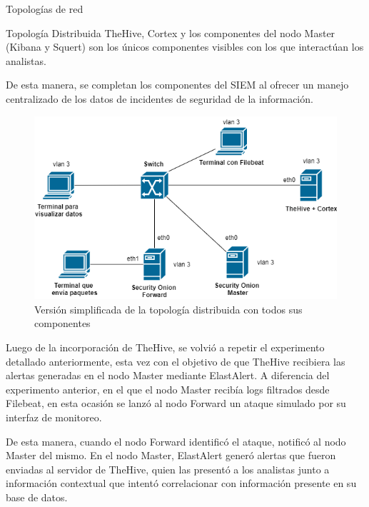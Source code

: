 \begin{section}{Topologías de red }
\begin{subsection} {Topología Distribuida}
            TheHive, Cortex y los componentes del nodo Master (Kibana y Squert) son los únicos componentes visibles con los que interactúan los analistas. \par
            De esta manera, se completan los componentes del SIEM al ofrecer un manejo centralizado de los datos de incidentes de seguridad de la información.\par
            \begin{figure}[h]
            \centering
             \includegraphics[width=1\textwidth]{./iteracion_1_imagenes/figura_33_c_topologia_de_prueba_3.png}
                \caption{Versión simplificada de la topología distribuida con todos sus componentes}
                \label{fig:topologia_distribuida_2}
            \end{figure}
            \FloatBarrier
            Luego de la incorporación de TheHive, se volvió a repetir el experimento detallado anteriormente, esta vez con el objetivo de que TheHive recibiera las alertas generadas en el nodo Master mediante ElastAlert. A diferencia del experimento anterior, en el que el nodo Master recibía logs filtrados desde Filebeat, en esta ocasión se lanzó al nodo Forward un ataque simulado por su interfaz de monitoreo.\par
            De esta manera, cuando el nodo Forward identificó el ataque, notificó al nodo Master del mismo. En el nodo Master, ElastAlert generó alertas que fueron enviadas al servidor de TheHive, quien las presentó a los analistas junto a información contextual que intentó correlacionar con información presente en su base de datos.\par
            \begin{figure}[h]

\end{figure}
\end{subsection}
\end{section}
